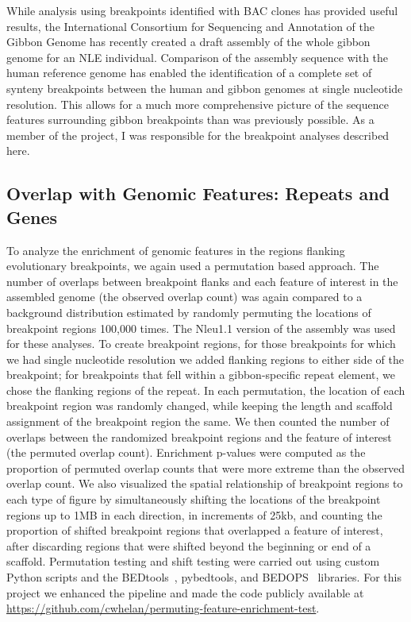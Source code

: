 While analysis using breakpoints identified with BAC clones has provided useful results, the International Consortium for Sequencing and Annotation of the Gibbon Genome has recently created a draft assembly of the whole gibbon genome for an NLE individual. Comparison of the assembly sequence with the human reference genome has enabled the identification of a complete set of synteny breakpoints between the human and gibbon genomes at single nucleotide resolution. This allows for a much more comprehensive picture of the sequence features surrounding gibbon breakpoints than was previously possible. As a member of the project, I was responsible for the breakpoint analyses described here.

\subsection{Overlap with Genomic Features: Repeats and Genes}

To analyze the enrichment of genomic features in the regions flanking evolutionary breakpoints, we again used a permutation based approach. The number of overlaps between breakpoint flanks and each feature of interest in the assembled genome (the observed overlap count) was again compared to a background distribution estimated by randomly permuting the locations of breakpoint regions 100,000 times. The Nleu1.1 version of the assembly was used for these analyses. To create breakpoint regions, for those breakpoints for which we had single nucleotide resolution we added flanking regions to either side of the breakpoint; for breakpoints that fell within a gibbon-specific repeat element, we chose the flanking regions of the repeat. In each permutation, the location of each breakpoint region was randomly changed, while keeping the length and scaffold assignment of the breakpoint region the same. We then counted the number of overlaps between the randomized breakpoint regions and the feature of interest (the permuted overlap count). Enrichment p-values were computed as the proportion of permuted overlap counts that were more extreme than the observed overlap count. We also visualized the spatial relationship of breakpoint regions to each type of figure by simultaneously shifting the locations of the breakpoint regions up to 1MB in each direction, in increments of 25kb, and counting the proportion of shifted breakpoint regions that overlapped a feature of interest, after discarding regions that were shifted beyond the beginning or end of a scaffold. Permutation testing and shift testing were carried out using custom Python scripts and the BEDtools~\cite{Quinlan:2010km}, pybedtools\cite{Dale:2011cl}, and BEDOPS~\cite{Neph:2012kq} libraries. For this project we enhanced the pipeline and made the code publicly available at \url{https://github.com/cwhelan/permuting-feature-enrichment-test}.


